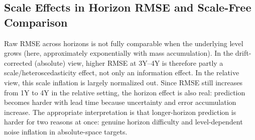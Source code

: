 \documentclass[pdflatex,sn-basic]{sn-jnl}
\begin{document}
\subsection{Scale Effects in Horizon RMSE and Scale-Free Comparison}
Raw RMSE across horizons is not fully comparable when the underlying level grows (here, approximately exponentially with mass accumulation). In the drift-corrected (absolute) view, higher RMSE at 3Y--4Y is therefore partly a scale/heteroscedasticity effect, not only an information effect. In the relative view, this scale inflation is largely normalized out. Since RMSE still increases from 1Y to 4Y in the relative setting, the horizon effect is also real: prediction becomes harder with lead time because uncertainty and error accumulation increase. The appropriate interpretation is that longer-horizon prediction is harder for two reasons at once: genuine horizon difficulty and level-dependent noise inflation in absolute-space targets.
\end{document}
